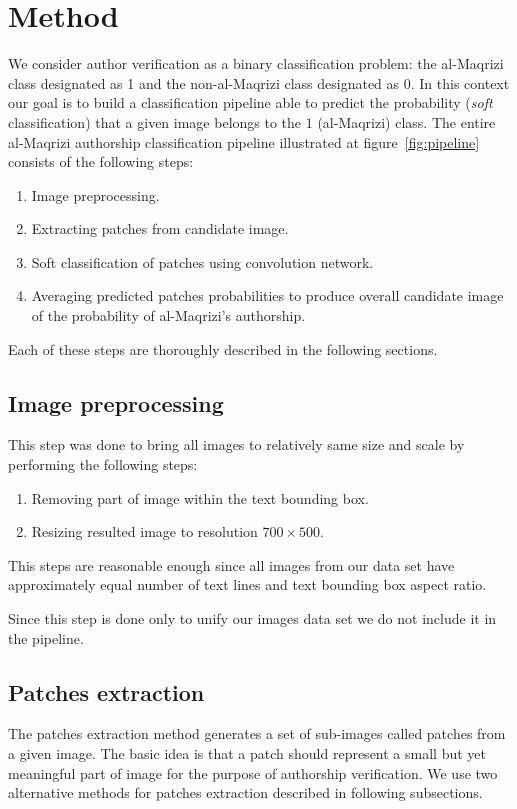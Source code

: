 \documentclass[conference,a4paper,twocolumn]{IEEEtran}
\begin{document}

\section{Method}
\label{sec:the_method}

We consider author verification as a binary classification problem: the al-Maqrizi class designated as 1 and the non-al-Maqrizi class designated as 0. In this context our goal is to build a classification pipeline able to predict the probability (\textit{soft} classification) that a given image belongs to the $1$ (al-Maqrizi) class. The entire al-Maqrizi authorship classification pipeline illustrated at figure~\ref{fig:pipeline} consists of the following steps:

\begin{enumerate}[start=0]
	\item Image preprocessing.
	\item Extracting patches from candidate image.
	\item Soft classification of patches using convolution network.
	\item Averaging predicted patches probabilities to produce overall candidate image of the probability of al-Maqrizi's authorship.
\end{enumerate}

Each of these steps are thoroughly described in the following sections.	


\subsection{Image preprocessing}
This step was done to bring all images to relatively same size and scale by performing the following steps:
\begin{enumerate}
	\item Removing part of image within the text bounding box.
	\item Resizing resulted image to resolution $700\times 500$.
\end{enumerate}
This steps are reasonable enough since all images from our data set have approximately equal number of text lines and text bounding box aspect ratio. 

Since this step is done only to unify our images data set we do not include it in the pipeline.

\subsection{Patches extraction}
The patches extraction method generates a set of sub-images called patches from a given image. The basic idea is that a patch should represent a small but yet meaningful part of image for the purpose of authorship verification. We use two alternative methods for patches extraction described in following subsections.
\end{document}
